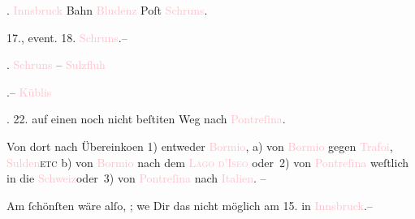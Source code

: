 .{ }\textcolor{pink}{Innsbruck}{}\ledrightnote{\textcolor{pink}{Innsbruck}} Bahn \textcolor{pink}{Bludenz}{}\ledrightnote{\textcolor{pink}{Bludenz}} Poſt \textcolor{pink}{Schruns}{}\ledrightnote{\textcolor{pink}{Schruns}}.\pend
           
\pstart
           {\pb}17., event. 18.{ }\textcolor{pink}{Schruns}{}\ledrightnote{\textcolor{pink}{Schruns}}.–\pend
           
.{ }\textcolor{pink}{Schruns}{}\ledrightnote{\textcolor{pink}{Schruns}} – \textcolor{pink}{Sulzfluh}{}\ledrightnote{\textcolor{pink}{Sulzfluh}}\pend
           
.\hspace*{4.5em}– \textcolor{pink}{Küblis}{}\ledrightnote{\textcolor{pink}{Küblis}}\pend
           
.{ }22. auf einen noch nicht beſti{\geminationm}ten Weg nach \textcolor{pink}{Pontreſina}{}\ledrightnote{\textcolor{pink}{Pontresina}}.\pend
           
\pstart
           Von dort nach Übereinko{\geminationm}en \introOben{}1)\introOben{}
               entweder \textcolor{pink}{Bormio}{}\ledrightnote{\textcolor{pink}{Bormio}}, \introOben{}a)\introOben{}
               von \textcolor{pink}{Bormio}{}\ledrightnote{\textcolor{pink}{Bormio}} gegen \textcolor{pink}{Trafoi}{}\ledrightnote{\textcolor{pink}{Trafoi}}, \textcolor{pink}{Sulden}{}\ledrightnote{\textcolor{pink}{Solda}}{ }\textsc{etc} b) von \textcolor{pink}{Bormio}{}\ledrightnote{\textcolor{pink}{Bormio}}
               nach dem \textsc{\textcolor{pink}{Lago d’Iseo}{}\ledrightnote{\textcolor{pink}{Iseosee}}} oder 2) von \textcolor{pink}{Pontreſina}{}\ledrightnote{\textcolor{pink}{Pontresina}} weſtlich in die
                  \textcolor{pink}{Schweiz}{}\ledrightnote{\textcolor{pink}{Schweiz}}{ }{\pb}oder 3) von \textcolor{pink}{Pontreſina}{}\ledrightnote{\textcolor{pink}{Pontresina}} nach \textcolor{pink}{Italien}{}\ledrightnote{\textcolor{pink}{Italien}}. –\pend
           
\pstart
           Am ſchönſten wäre alſo, \label{K_L03176-1v}\label{K_L03176-1h}; we{\geminationn} Dir das nicht möglich am 15. in \textcolor{pink}{Innsbruck}{}\ledrightnote{\textcolor{pink}{Innsbruck}}.–\pend
           
